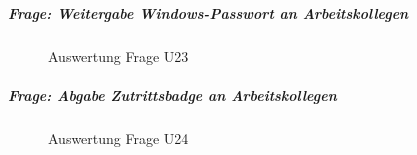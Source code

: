 \documentclass[../../main.tex]{subfiles}
\begin{document}
\subparagraph*{Frage: Weitergabe Windows-Passwort an Arbeitskollegen}\mbox{}
\begin{figure}[H]
\centering
{}
\caption{Auswertung Frage U23}
\label{U23}
\end{figure}

\subparagraph*{Frage: Abgabe Zutrittsbadge an Arbeitskollegen}\mbox{}
\begin{figure}[H]
\centering
{}
\caption{Auswertung Frage U24}
\label{U24}
\end{figure}
\end{document}

